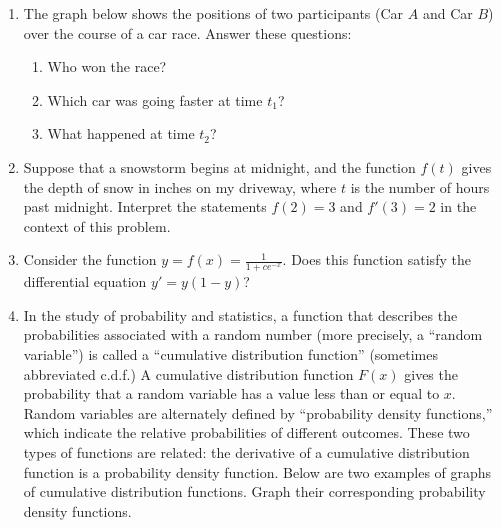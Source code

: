 \documentclass{article}
\begin{document}
\begin{enumerate}
    	\item The graph below shows the positions of two participants (Car $A$ and Car $B$) over the course of a car race. Answer these questions:
    	\begin{enumerate}
    	    \item Who won the race?
    	    \item Which car was going faster at time $t_1$?
    	    \item What happened at time $t_2$?
    	\end{enumerate}
    	\begin{center}
    	\end{center}

                  \item Suppose that a snowstorm begins at midnight, and the function $f(t)$ gives the depth of snow in inches on my driveway, where $t$ is the number of hours past midnight. Interpret the statements $f(2) = 3$ and $f'(3) = 2$ in the context of this problem.          
                 \item Consider the function $\displaystyle y=f(x) = \frac{1}{1+ce^{-x}}$.  Does this function satisfy the differential equation $y'=y(1-y)$?
                 \item In the study of probability and statistics, a function that describes the probabilities associated with a random number (more precisely, a ``random variable'') is called a ``cumulative distribution function'' (sometimes abbreviated c.d.f.) A cumulative distribution function $F(x)$ gives the probability that a random variable has a value less than or equal to $x$. Random variables are alternately defined by ``probability density functions,'' which indicate the relative probabilities of different outcomes. These two types of functions are related: the derivative of a cumulative distribution function is a probability density function. Below are two examples of graphs of cumulative distribution functions. Graph their corresponding probability density functions.
                 

\end{enumerate}
\end{document}
